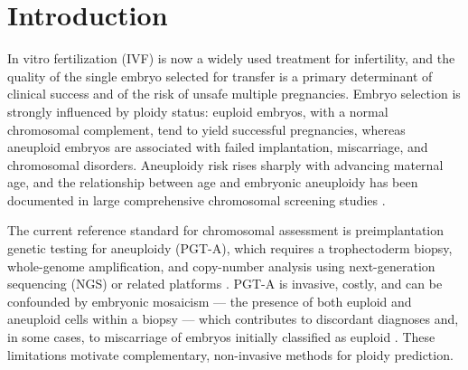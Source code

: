 \section{Introduction}

In vitro fertilization (IVF) is now a widely used treatment for infertility, and the quality of the single embryo selected for transfer is a primary determinant of clinical success and of the risk of unsafe multiple pregnancies. Embryo selection is strongly influenced by ploidy status: euploid embryos, with a normal chromosomal complement, tend to yield successful pregnancies, whereas aneuploid embryos are associated with failed implantation, miscarriage, and chromosomal disorders. Aneuploidy risk rises sharply with advancing maternal age, and the relationship between age and embryonic aneuploidy has been documented in large comprehensive chromosomal screening studies \citep{franasiak2014aneuploidy}.

The current reference standard for chromosomal assessment is preimplantation genetic testing for aneuploidy (PGT-A), which requires a trophectoderm biopsy, whole-genome amplification, and copy-number analysis using next-generation sequencing (NGS) or related platforms \citep{garciapascual2020ngs,friedenthal2020ngs}. PGT-A is invasive, costly, and can be confounded by embryonic mosaicism --- the presence of both euploid and aneuploid cells within a biopsy --- which contributes to discordant diagnoses and, in some cases, to miscarriage of embryos initially classified as euploid \citep{maxwell2016miscarriage}. These limitations motivate complementary, non-invasive methods for ploidy prediction.

